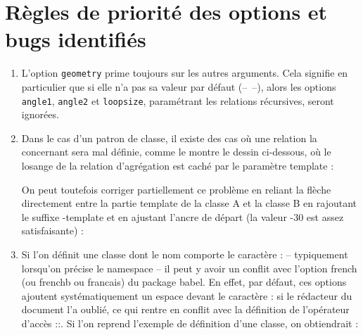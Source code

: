 \documentclass[a4paper,11pt]{report}
\newcommand{\inputTikZ}[1]{%
  }%
\newcommand{\inputTikZ}[1]{%
    \texttt{[image: fig/\#1.pdf]}%
  }%
\begin{document}
\section{Règles de priorité des options et bugs identifiés}\label{s.classbug}

\begin{enumerate}
\item L'option {\tt geometry} prime toujours sur les autres arguments. Cela signifie en particulier que si elle n'a pas sa valeur par défaut (--~--), alors les options {\tt angle1}, {\tt angle2} et {\tt loopsize}, paramétrant les relations récursives, seront ignorées.
\item Dans le cas d'un patron de classe, il existe des cas où une relation la concernant sera mal définie, comme le montre le dessin ci-dessous, où le losange de la relation d'agrégation est caché par le paramètre template :

\begin{minipage}{0.6\textwidth}

\end{minipage}
\begin{minipage}{0.4\textwidth}
\begin{center}
\inputTikZ{bugtemplate}
\end{center}
\end{minipage}

\medskip

On peut toutefois corriger partiellement ce problème en reliant la flèche directement entre la partie template de la classe A et la classe B en rajoutant le suffixe -template et en ajustant l'ancre de départ (la valeur -30 est assez satisfaisante) : 

\medskip

\begin{minipage}{0.6\textwidth}

\end{minipage}
\begin{minipage}{0.4\textwidth}
\begin{center}
\inputTikZ{bugtemplate2}
\end{center}
\end{minipage}

\medskip

\item Si l'on définit une classe dont le nom comporte le caractère : -- typiquement lorsqu'on précise le namespace -- il peut y avoir un conflit avec l'option french (ou frenchb ou francais) du package babel. En effet, par défaut, ces options ajoutent systématiquement un espace devant le caractère : si le rédacteur du document l'a oublié, ce qui rentre en conflit avec la définition de l'opérateur d'accès ::. Si l'on reprend l'exemple de définition d'une classe, on obtiendrait :


\end{enumerate}
\end{document}
